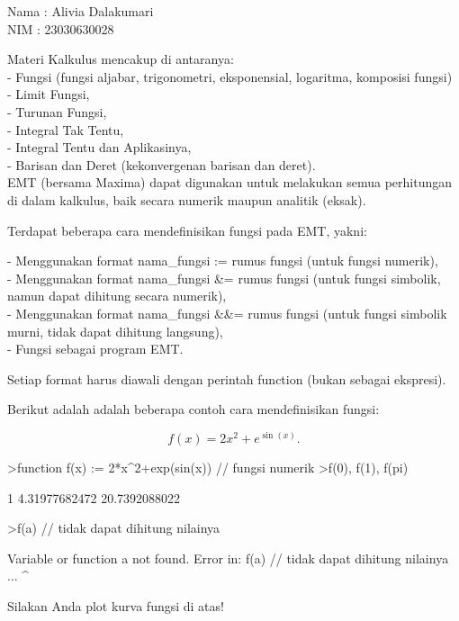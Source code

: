 \documentclass[a4paper,10pt]{article}
\begin{document}
\begin{eulernotebook}
\begin{eulercomment}
Nama : Alivia Dalakumari\\
NIM : 23030630028

Materi Kalkulus mencakup di antaranya:\\
- Fungsi (fungsi aljabar, trigonometri, eksponensial, logaritma,
komposisi fungsi)\\
- Limit Fungsi,\\
- Turunan Fungsi,\\
- Integral Tak Tentu,\\
- Integral Tentu dan Aplikasinya,\\
- Barisan dan Deret (kekonvergenan barisan dan deret).\\
EMT (bersama Maxima) dapat digunakan untuk melakukan semua perhitungan
di dalam kalkulus, baik secara numerik maupun analitik (eksak).

\end{eulercomment}
\begin{eulercomment}
Terdapat beberapa cara mendefinisikan fungsi pada EMT, yakni:

- Menggunakan format nama\_fungsi := rumus fungsi (untuk fungsi
numerik),\\
- Menggunakan format nama\_fungsi \&= rumus fungsi (untuk fungsi
simbolik, namun dapat dihitung secara numerik),\\
- Menggunakan format nama\_fungsi \&\&= rumus fungsi (untuk fungsi
simbolik murni, tidak dapat dihitung langsung),\\
- Fungsi sebagai program EMT.

Setiap format harus diawali dengan perintah function (bukan sebagai
ekspresi).

Berikut adalah adalah beberapa contoh cara mendefinisikan fungsi:

\end{eulercomment}
\begin{eulerformula}
\[
f(x)=2x^2+e^{\sin(x)}.
\]
\end{eulerformula}
\begin{eulerprompt}
>function f(x) := 2*x^2+exp(sin(x)) // fungsi numerik
>f(0), f(1), f(pi)
\end{eulerprompt}
\begin{euleroutput}
  1
  4.31977682472
  20.7392088022
\end{euleroutput}
\begin{eulerprompt}
>f(a) // tidak dapat dihitung nilainya
\end{eulerprompt}
\begin{euleroutput}
  Variable or function a not found.
  Error in:
  f(a) // tidak dapat dihitung nilainya ...
     ^
\end{euleroutput}
\begin{eulercomment}
Silakan Anda plot kurva fungsi di atas!


\end{eulercomment}
\end{eulernotebook}
\end{document}
